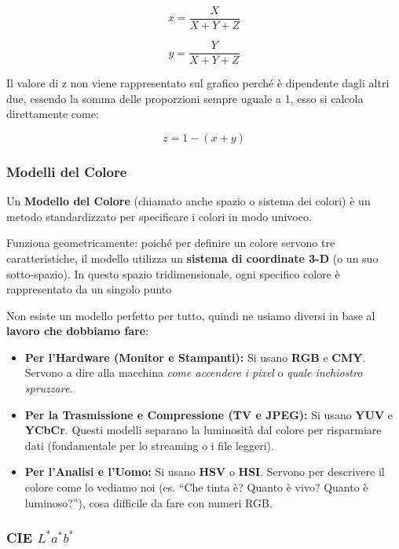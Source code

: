\documentclass[
]{article}
\providecommand{\tightlist}{%
  \setlength{\itemsep}{0pt}\setlength{\parskip}{0pt}}
\begin{document}
\[
x = \frac{X}{X + Y + Z}
\]

\[
y = \frac{Y}{X+Y+Z}
\]

Il valore di z non viene rappresentato sul grafico perché è dipendente dagli altri due, essendo la somma delle proporzioni sempre uguale a 1, esso si calcola direttamente come:

\[
z = 1 - (x + y)
\]

\hypertarget{modelli-del-colore}{%
\subsubsection{Modelli del Colore}\label{modelli-del-colore}}

Un \textbf{Modello del Colore} (chiamato anche spazio o sistema dei colori) è un metodo standardizzato per specificare i colori in modo univoco.

Funziona geometricamente: poiché per definire un colore servono tre caratteristiche, il modello utilizza un \textbf{sistema di coordinate 3-D} (o un suo sotto-spazio). In questo spazio tridimensionale, ogni specifico colore è rappresentato da un singolo punto

Non esiste un modello perfetto per tutto, quindi ne usiamo diversi in base al \textbf{lavoro che dobbiamo fare}:

\begin{itemize}
\tightlist
\item
  \textbf{Per l'Hardware (Monitor e Stampanti):} Si usano \textbf{RGB} e \textbf{CMY}. Servono a dire alla macchina \emph{come accendere i pixel} o \emph{quale inchiostro spruzzare}.
\item
  \textbf{Per la Trasmissione e Compressione (TV e JPEG):} Si usano \textbf{YUV} e \textbf{YCbCr}. Questi modelli separano la luminosità dal colore per risparmiare dati (fondamentale per lo streaming o i file leggeri).
\item
  \textbf{Per l'Analisi e l'Uomo:} Si usano \textbf{HSV} o \textbf{HSI}. Servono per descrivere il colore come lo vediamo noi (es. ``Che tinta è? Quanto è vivo? Quanto è luminoso?''), cosa difficile da fare con numeri RGB.
\end{itemize}

\hypertarget{cie-l-a-b}{%
\subsubsection{\texorpdfstring{CIE \(L^* a^* b^*\)}{CIE L\^{}* a\^{}* b\^{}*}}\label{cie-l-a-b}}
\end{document}
